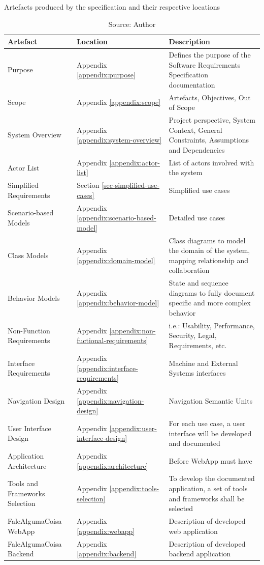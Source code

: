 \begin{table}[h]
\centering
\caption{Artefacts produced by the specification and their respective locations}
\label{tab:artifact-locations}
\begin{tabular}{|p{3.5cm}|p{2.5cm}|p{9cm}|}
    \hline 
    Artefact & Location & Description \\ \hline 
    Purpose & Appendix \ref{appendix:purpose} & Defines the purpose of the Software Requirements Specification documentation \\ \hline
    Scope & Appendix \ref{appendix:scope} & Artefacts, Objectives, Out of Scope \\ \hline
    System Overview & Appendix \ref{appendix:system-overview} & Project perspective, System Context, General Constraints, Assumptions and Dependencies \\ \hline
    Actor List & Appendix \ref{appendix:actor-list} & List of actors involved with the system \\ \hline 
    Simplified Requirements & Section \ref{sec-simplified-use-cases} & Simplified use cases \\ \hline
    Scenario-based Models & Appendix \ref{appendix:scenario-based-model} & Detailed use cases \\ \hline
    Class Models & Appendix \ref{appendix:domain-model} & Class diagrams to model the domain of the system, mapping relationship and collaboration \\ \hline
    Behavior Models & Appendix \ref{appendix:behavior-model} & State and sequence diagrams to fully document specific and more complex behavior \\ \hline
    Non-Function Requirements & Appendix \ref{appendix:non-fuctional-requirements} & i.e.: Usability, Performance, Security, Legal, Requirements, etc. \\ \hline
    Interface Requirements & Appendix \ref{appendix:interface-requirements} & Machine and External Systems interfaces \\ \hline
    Navigation Design & Appendix \ref{appendix:navigation-design} & Navigation Semantic Units \\ \hline
    User Interface Design & Appendix \ref{appendix:user-interface-design} & For each use case, a user interface will be developed and documented \\ \hline
    Application Architecture & Appendix \ref{appendix:architecture} & Before WebApp must have  \\ \hline
    Tools and Frameworks Selection & Appendix \ref{appendix:tools-selection} & To develop the documented application, a set of tools and frameworks shall be selected \\ \hline
    FaleAlgumaCoisa WebApp & Appendix \ref{appendix:webapp} & Description of developed web application \\ \hline
    FaleAlgumaCoisa Backend & Appendix \ref{appendix:backend} & Description of developed backend application \\ \hline
\end{tabular}
\caption*{Source: Author}
\end{table}

